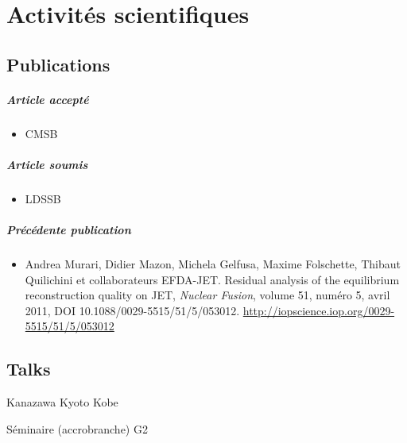 \chapter{Activités scientifiques}

\section{Publications}

\paragraph{Article accepté}
\begin{itemize}
\item[] CMSB
\end{itemize}

\paragraph{Article soumis}
\begin{itemize}
\item[] LDSSB
\end{itemize}

\paragraph{Précédente publication}
\begin{itemize}
\item[] Andrea Murari, Didier Mazon, Michela Gelfusa, Maxime Folschette, Thibaut Quilichini et collaborateurs EFDA-JET.
Residual analysis of the equilibrium reconstruction quality on JET, \textit{Nuclear Fusion},
volume 51, numéro 5, avril 2011, DOI 10.1088/0029-5515/51/5/053012.
\url{http://iopscience.iop.org/0029-5515/51/5/053012}
\end{itemize}


\section{Talks}

Kanazawa
Kyoto
Kobe

Séminaire (accrobranche)
G2